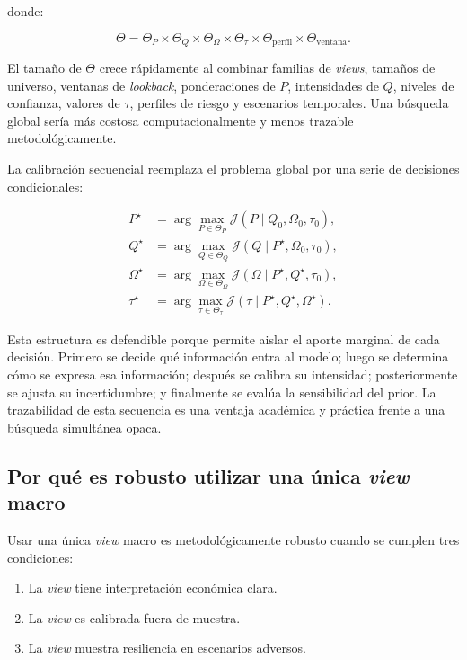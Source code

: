 \documentclass[11pt]{article}
\begin{document}
donde:

\begin{equation}
    \Theta
    =
    \Theta_P
    \times
    \Theta_Q
    \times
    \Theta_{\Omega}
    \times
    \Theta_{\tau}
    \times
    \Theta_{\text{perfil}}
    \times
    \Theta_{\text{ventana}}.
\end{equation}

El tama\~no de $\Theta$ crece r\'apidamente al combinar familias de \textit{views}, tama\~nos de universo, ventanas de \textit{lookback}, ponderaciones de $P$, intensidades de $Q$, niveles de confianza, valores de $\tau$, perfiles de riesgo y escenarios temporales. Una b\'usqueda global ser\'ia m\'as costosa computacionalmente y menos trazable metodol\'ogicamente.

La calibraci\'on secuencial reemplaza el problema global por una serie de decisiones condicionales:

\begin{align}
    P^\star
    &=
    \arg\max_{P \in \Theta_P}
    \mathcal{J}(P \mid Q_0,\Omega_0,\tau_0), \\
    Q^\star
    &=
    \arg\max_{Q \in \Theta_Q}
    \mathcal{J}(Q \mid P^\star,\Omega_0,\tau_0), \\
    \Omega^\star
    &=
    \arg\max_{\Omega \in \Theta_{\Omega}}
    \mathcal{J}(\Omega \mid P^\star,Q^\star,\tau_0), \\
    \tau^\star
    &=
    \arg\max_{\tau \in \Theta_{\tau}}
    \mathcal{J}(\tau \mid P^\star,Q^\star,\Omega^\star).
\end{align}

Esta estructura es defendible porque permite aislar el aporte marginal de cada decisi\'on. Primero se decide qu\'e informaci\'on entra al modelo; luego se determina c\'omo se expresa esa informaci\'on; despu\'es se calibra su intensidad; posteriormente se ajusta su incertidumbre; y finalmente se eval\'ua la sensibilidad del prior. La trazabilidad de esta secuencia es una ventaja acad\'emica y pr\'actica frente a una b\'usqueda simult\'anea opaca.

\subsection{Por qu\'e es robusto utilizar una \'unica \textit{view} macro}

Usar una \'unica \textit{view} macro es metodol\'ogicamente robusto cuando se cumplen tres condiciones:

\begin{enumerate}
    \item La \textit{view} tiene interpretaci\'on econ\'omica clara.
    \item La \textit{view} es calibrada fuera de muestra.
    \item La \textit{view} muestra resiliencia en escenarios adversos.
\end{enumerate}
\end{document}
